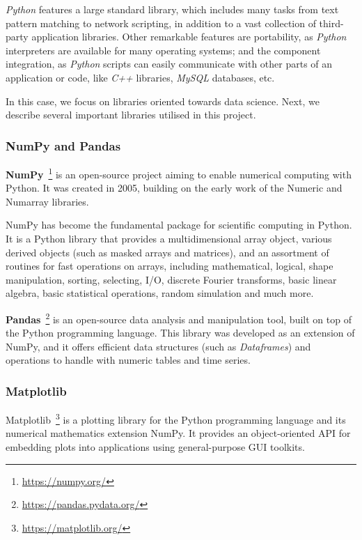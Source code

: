\documentclass[a4paper, 12pt]{book}
\begin{document}
\emph{Python} features a large standard library, which includes many tasks from text pattern matching to network
scripting, in addition to a vast collection of third-party application libraries.
Other remarkable features are portability, as \emph{Python} interpreters are available for many operating systems;
and the component integration, as \emph{Python} scripts can easily communicate with other parts of an application or code,
like \emph{C++} libraries, \emph{MySQL} databases, etc.

In this case, we focus on libraries oriented towards data science. Next, we describe several important libraries utilised in this project.

\subsubsection{NumPy and Pandas}
\label{sssec:numpy-pandas}

\textbf{NumPy}~\footnote{\url{https://numpy.org/}} is an open-source project aiming to enable numerical computing with Python. It was created in 2005, building on the early work of the Numeric and Numarray libraries. 

NumPy has become the fundamental package for scientific computing in Python. It is a Python library that provides a multidimensional array object, various derived objects (such as masked arrays and matrices), and an assortment of routines for fast operations on arrays, including mathematical, logical, shape manipulation, sorting, selecting, I/O, discrete Fourier transforms, basic linear algebra, basic statistical operations, random simulation and much more.

\textbf{Pandas}~\footnote{\url{https://pandas.pydata.org/}} is an open-source data analysis and manipulation tool, built on top of the Python programming language. This library was developed as an extension of NumPy, and it offers efficient data structures (such as \emph{Dataframes}) and operations to handle with numeric tables and time series.

\subsubsection{Matplotlib}
\label{sssec:matplotlib}

Matplotlib~\footnote{\url{https://matplotlib.org/}} is a plotting library for the Python programming language and its numerical mathematics extension NumPy. It provides an object-oriented API for embedding plots into applications using general-purpose GUI toolkits.
\end{document}
